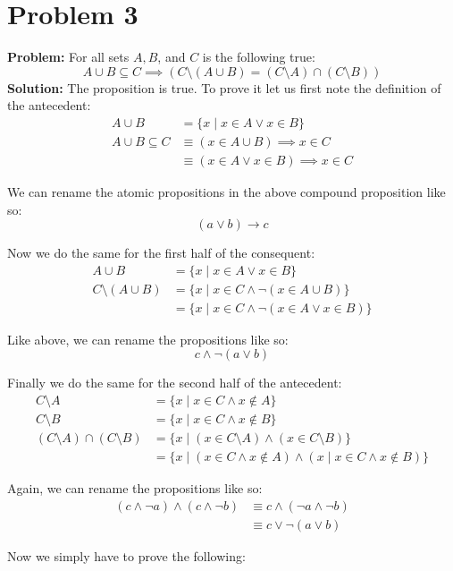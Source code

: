 \documentclass{article}
\begin{document}
\section*{Problem 3}
\textbf{Problem:} For all sets $A,B$, and $C$ is the following true:
$$A\cup B\subseteq C\implies (C\setminus(A\cup B) = (C\setminus A)\cap (C\setminus B))$$
\textbf{Solution:} The proposition is true. To prove it let us first note the definition of the antecedent:
\begin{align*}
  A\cup B &= \{x\mid x\in A \vee x\in B\}\\
  A\cup B\subseteq C&\equiv (x\in A\cup B)\implies x\in C\\
  &\equiv (x\in A \vee x\in B)\implies x\in C
\end{align*}

We can rename the atomic propositions in the above compound proposition like so:
$$(a \vee b)\rightarrow c$$

Now we do the same for the first half of the consequent:
\begin{align*}
  A\cup B &= \{x\mid x\in A \vee x\in B\}\\
  C\setminus(A\cup B)&= \{x\mid x\in C\wedge \neg(x\in A\cup B)\}\\
  &= \{x\mid x\in C\wedge \neg(x\in A \vee x\in B)\}
\end{align*}

Like above, we can rename the propositions like so:
$$c\wedge\neg(a \vee b)$$

Finally we do the same for the second half of the antecedent:
\begin{align*}
  C\setminus A &= \{x\mid x\in C \wedge x\not\in A\}\\
  C\setminus B &= \{x\mid x\in C \wedge x\not\in B\}\\
  (C\setminus A)\cap (C\setminus B)&= \{x\mid (x\in C\setminus A) \wedge (x\in C\setminus B)\}\\
  &= \{x\mid (x\in C \wedge x\not\in A) \wedge (x\mid x\in C \wedge x\not\in B)\}
\end{align*}

Again, we can rename the propositions like so:
\begin{align*}
  (c\wedge\neg a)\wedge(c\wedge\neg b)&\equiv c\wedge(\neg a\wedge\neg b) \tag{distributive property}\\
  &\equiv c\vee\neg (a\vee b)\tag{De Morgan's law}
\end{align*}

Now we simply have to prove the following:
\end{document}
